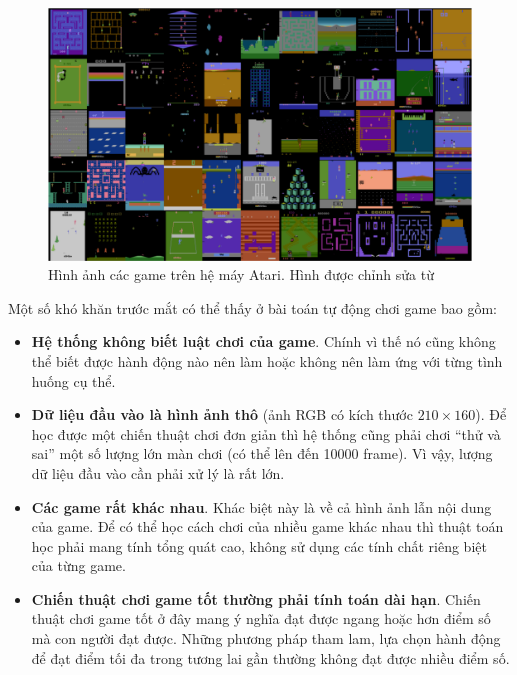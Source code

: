 \begin{figure}
	\centering
	\includegraphics[width=\textwidth]{ale_55_games}
	\caption[Hình ảnh các game trên hệ máy Atari]{Hình ảnh các game trên hệ máy Atari.
	Hình được chỉnh sửa từ \cite{defazio2014comparison}}
	\label{Ale55Games}
\end{figure}

Một số khó khăn trước mắt có thể thấy ở bài toán tự động chơi game bao gồm:
\begin{itemize}
	\item \textbf{Hệ thống không biết luật chơi của game}. 
	Chính vì thế nó cũng không thể biết được hành động nào nên làm hoặc không nên làm ứng với từng tình huống cụ thể.
	\item \textbf{Dữ liệu đầu vào là hình ảnh thô} (ảnh RGB có kích thước $210\times160$). 
	Để học được một chiến thuật chơi đơn giản thì hệ thống cũng phải chơi ``thử và sai'' một số lượng lớn màn chơi (có thể lên đến 10000 frame). 
	Vì vậy, lượng dữ liệu đầu vào cần phải xử lý là rất lớn.
	\item \textbf{Các game rất khác nhau}.
	Khác biệt này là về cả hình ảnh lẫn nội dung của game.
	Để có thể học cách chơi của nhiều game khác nhau thì thuật toán học phải mang tính tổng quát cao, không sử dụng các tính chất riêng biệt của từng game.
	\item \textbf{Chiến thuật chơi game tốt thường phải tính toán dài hạn}.
	Chiến thuật chơi game tốt ở đây mang ý nghĩa đạt được ngang hoặc hơn điểm số mà con người đạt được.
	Những phương pháp tham lam, lựa chọn hành động để đạt điểm tối đa trong tương lai gần thường không đạt được nhiều điểm số.
\end{itemize}


